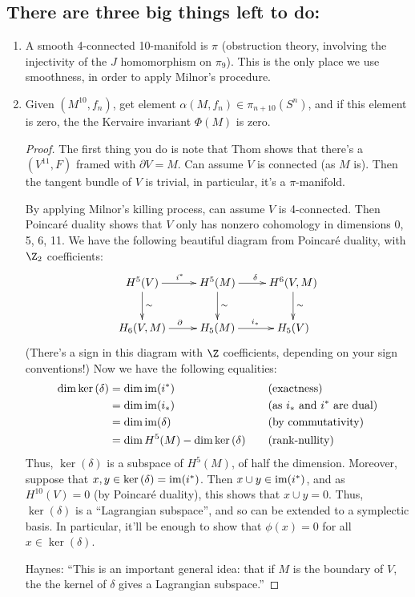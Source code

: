 \documentclass[11pt]{article}
\begin{document}
\begin{JandrKervaire}
\subsection*{There are three big things left to do:}
\begin{enumerate}
\item A smooth 4-connected 10-manifold is $\pi$ (obstruction theory, involving the injectivity of the $J$ homomorphism on $\pi_9$). This is the only place we use smoothness, in order to apply Milnor's procedure.
\item Given $(M^{10},f_n)$, get element $\alpha(M,f_n)\in\pi_{n+10}(S^n)$, and if this element is zero, the the Kervaire invariant $\Phi(M)$ is zero.
\begin{proof}
The first thing you do is note that Thom shows that there's a $(V^{11},F)$ framed with $\partial V=M$. Can assume $V$ is connected (as $M$ is). Then the tangent bundle of $V$ is trivial, in particular, it's a $\pi$-manifold.

By applying Milnor's killing process, can assume $V$ is 4-connected. Then Poincar\'e duality shows that $V$ only has nonzero cohomology in dimensions 0, 5, 6, 11. We have the following beautiful diagram from Poincar\'e duality, with $\Z_2$ coefficients:
\[\xymatrix{
H^5(V)\ar[d]^\sim\ar[r]^{i^*}& H^5(M)\ar[d]^\sim\ar[r]^\delta&H^6(V,M)\ar[d]^\sim\\
H_6(V,M)\ar[r]^\partial&H_5(M)\ar[r]^{i_*}&H_5(V)
}\]
(There's a sign in this diagram with $\Z$ coefficients, depending on your sign conventions!)
Now we have the following equalities:
\begin{alignat*}{2}
\dim\textup{ker}\,(\delta)&=\dim\operatorname{im}(i^*)&\quad&\text{(exactness)}\\
&=\dim\operatorname{im} (i_*)&&\text{(as $i_*$ and $i^*$ are dual)}\\
&=\dim\operatorname{im}(\delta)&&\text{(by commutativity)}\\
&=\dim H^5(M)-\dim\textup{ker}\,(\delta)&&\text{(rank-nullity)}
\end{alignat*}
Thus, $\ker(\delta)$ is a subspace of $H^5(M)$, of half the dimension. Moreover, suppose that $x,y\in\textup{ker}\,(\delta)=\operatorname{im}(i^*)$. Then $x\cup y\in\operatorname{im}(i^*)$, and as $H^{10}(V)=0$ (by Poincar\'e duality), this shows that $x\cup y=0$. Thus, $\ker(\delta)$ is a ``Lagrangian subspace'', and so can be extended to a symplectic basis. In particular, it'll be enough to show that $\phi(x)=0$ for all $x\in\ker(\delta)$.

Haynes: ``This is an important general idea: that if $M$ is the boundary of $V$, the the kernel of $\delta$ gives a Lagrangian subspace.''


\end{proof}
\end{enumerate}
\end{JandrKervaire}
\end{document}
